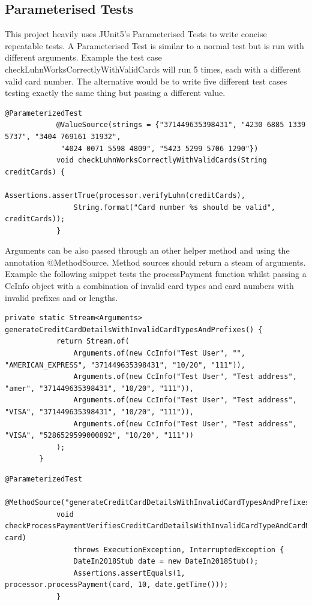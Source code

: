 \documentclass[11pt, a4paper]{article}
\begin{document}
    \subsection{Parameterised Tests}
        This project heavily uses JUnit5's Parameterised Tests to write concise repeatable tests. A Parameterised Test is similar to a normal test but is run with different arguments. Example the test case checkLuhnWorksCorrectlyWithValidCards will run 5 times, each with a different valid card number. The alternative would be to write five different test cases testing exactly the same thing but passing a different value.
        \begin{lstlisting}[caption=A Parameterised Test using a Value Source]
            @ParameterizedTest
            @ValueSource(strings = {"371449635398431", "4230 6885 1339 5737", "3404 769161 31932",
             "4024 0071 5598 4809", "5423 5299 5706 1290"})
            void checkLuhnWorksCorrectlyWithValidCards(String creditCards) {
                Assertions.assertTrue(processor.verifyLuhn(creditCards),
                String.format("Card number %s should be valid", creditCards));
            }  
        \end{lstlisting}
        Arguments can be also passed through an other helper method and using the annotation @MethodSource. Method sources should return a steam of arguments. Example the following snippet tests the processPayment function whilst passing a CcInfo object with a combination of invalid card types and card numbers with invalid prefixes and or lengths.
        \begin{lstlisting}[caption=An example of a method source]
        private static Stream<Arguments> generateCreditCardDetailsWithInvalidCardTypesAndPrefixes() {
            return Stream.of(
                Arguments.of(new CcInfo("Test User", "", "AMERICAN_EXPRESS", "371449635398431", "10/20", "111")),
                Arguments.of(new CcInfo("Test User", "Test address", "amer", "371449635398431", "10/20", "111")),
                Arguments.of(new CcInfo("Test User", "Test address", "VISA", "371449635398431", "10/20", "111")),
                Arguments.of(new CcInfo("Test User", "Test address", "VISA", "5286529599000892", "10/20", "111"))
            );
        }
        \end{lstlisting}
        \begin{lstlisting}[caption=An example of a test case recieving a method source]
            @ParameterizedTest
            @MethodSource("generateCreditCardDetailsWithInvalidCardTypesAndPrefixes")
            void checkProcessPaymentVerifiesCreditCardDetailsWithInvalidCardTypeAndCardNumber(CcInfo card)
                throws ExecutionException, InterruptedException {
                DateIn2018Stub date = new DateIn2018Stub();
                Assertions.assertEquals(1, processor.processPayment(card, 10, date.getTime()));
            }
        \end{lstlisting}
\end{document}

